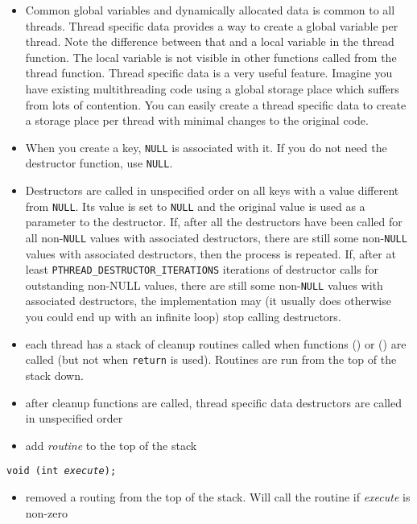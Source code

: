 \begin{itemize}
\item \label{THREAD_SPECIFIC_DATA} Common global variables and dynamically
allocated data is common to all threads.  Thread specific data provides a way to
create a global variable per thread.  Note the difference between that and a
local variable in the thread function.  The local variable is not visible in
other functions called from the thread function.  Thread specific data is a very
useful feature.  Imagine you have existing multithreading code using a global
storage place which suffers from lots of contention.  You can easily create a
thread specific data to create a storage place per thread with minimal changes
to the original code.
\item When you create a key, \texttt{NULL} is associated with it.  If you do not
need the destructor function, use \texttt{NULL}.
\item Destructors are called in unspecified order on all keys with a value
different from \texttt{NULL}.  Its value is set to \texttt{NULL} and the
original value is used as a parameter to the destructor.  If, after all the
destructors have been called for all non-\texttt{NULL} values with associated
destructors, there are still some non-\texttt{NULL} values with associated
destructors, then the process is repeated.  If, after at least
\texttt{PTHREAD\_DESTRUCTOR\_ITERATIONS} iterations of destructor calls for
outstanding non-NULL values, there are still some non-\texttt{NULL} values with
associated destructors, the implementation may (it usually does otherwise you
could end up with an infinite loop) stop calling destructors.
\end{itemize}



\begin{slide}
\begin{itemize}
\item each thread has a stack of cleanup routines called when functions
() or () are called (but not when
\texttt{return} is used).  Routines are run from the top of the stack down.
\item after cleanup functions are called, thread specific data destructors are
called in unspecified order
\end{itemize}
\begin{itemize}
\item add \emph{routine} to the top of the stack
\end{itemize}
\texttt{void (int \emph{execute});}
\begin{itemize}
\item removed a routing from the top of the stack.  Will call the routine if
\emph{execute} is non-zero
\end{itemize}
\end{slide}

